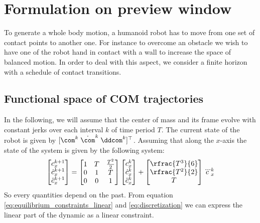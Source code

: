 \section{Formulation on preview window}
\label{sec:preview_window}
To generate a whole body motion, a humanoid robot has to move from one set of contact points to another one.
For instance to overcome an obstacle we wish to have one of the robot hand 
in contact with a wall to increase the space of balanced motion.
In order to deal with this aspect, we consider a finite horizon with a schedule of contact transitions.

\subsection*{Functional space of COM trajectories}
In the following, we will assume that the center of mass and its frame evolve with constant jerks over each interval $k$ of time period $T$.
The current state of the robot is given by $[\com^k \; \dot{\com}^k \; \ddcom^k ]^{\top}$.
Assuming that along the $x$-axis the state of the system is given by the
following system:
\begin{equation}
  \left[ 
  \begin{matrix}
    c^{k+1}_x \\
    \dot{c}^{k+1}_x \\
    \ddot{c}^{k+1}_x
  \end{matrix}
  \right]       
  =
  \left[
  \begin{matrix}
    1 & T & \frac{T^2}{2} \\
    0 & 1 & T \\        
    0 & 0 & 1
  \end{matrix}
  \right]
  \left[
  \begin{matrix}
    c^{k}_x \\
    \dot{c}^{k}_x \\
    \ddot{c}^{k}_x 
  \end{matrix}
    \right]     
  + 
  \left[
  \begin{matrix}
    \rfrac{T^3}{6} \\
    \rfrac{T^2}{2} \\
    T
  \end{matrix}
  \right]
  \dddot{c}^k_x
  \label{eq:discretization}
\end{equation}
%
So every quantities depend on the past.
From equation \eqref{eq:equilibrium_constraints_linear} and \eqref{eq:discretization} we can express the linear part of the dynamic as a linear constraint.

